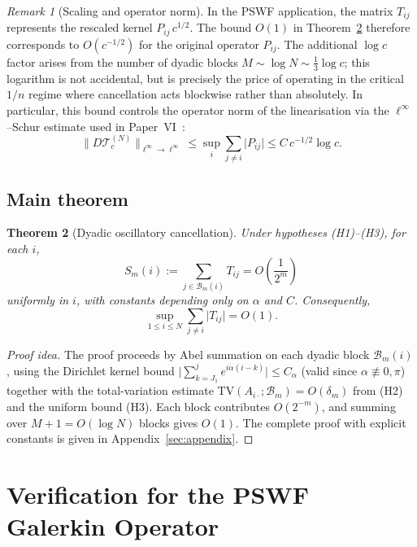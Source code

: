 \documentclass[12pt]{amsart}
\newtheorem{theorem}{Theorem}[section]
\theoremstyle{definition}
\theoremstyle{remark}
\newtheorem{remark}[theorem]{Remark}
\newcommand{\norm}[1]{\lVert#1\rVert}
\newcommand{\abs}[1]{\lvert#1\rvert}
\newcommand{\Bm}{\mathcal{B}_m}
\begin{document}
\begin{remark}[Scaling and operator norm]
\label{rem:scaling}
In the PSWF application, the matrix $T_{ij}$ represents the
rescaled kernel $P_{ij}\,c^{1/2}$.
The bound $O(1)$ in Theorem~\ref{thm:dyadic_cancellation}
therefore corresponds to $O(c^{-1/2})$ for the original
operator $P_{ij}$.
The additional $\log c$ factor arises from the number of
dyadic blocks $M \sim \log N \sim \tfrac{1}{3}\log c$;
this logarithm is not accidental, but is precisely the
price of operating in the critical $1/n$ regime where
cancellation acts blockwise rather than absolutely.
In particular, this bound controls the operator norm of the
linearisation via the $\ell^\infty$--Schur estimate used
in Paper~VI~\cite{paperVI}:
\[
  \norm{D\mathcal{T}_c^{(N)}}_{\ell^\infty\to\ell^\infty}
  \leq
  \sup_i \sum_{j\neq i} \abs{P_{ij}}
  \leq C\,c^{-1/2}\log c.
\]
\end{remark}

\subsection{Main theorem}

\begin{theorem}[Dyadic oscillatory cancellation]
\label{thm:dyadic_cancellation}
Under hypotheses \textup{(H1)--(H3)}, for each $i$,
\[
  S_m(i):=\sum_{j\in\Bm(i)} T_{ij}
  = O\!\left(\frac{1}{2^m}\right)
\]
uniformly in $i$, with constants depending only on $\alpha$
and $C$.
Consequently,
\[
  \sup_{1\leq i\leq N}\sum_{j\neq i}\abs{T_{ij}} = O(1).
\]
\end{theorem}

\begin{proof}[Proof idea]
The proof proceeds by Abel summation on each dyadic block
$\Bm(i)$, using the Dirichlet kernel bound
$\abs{\sum_{k=J_1}^j e^{i\alpha(i-k)}} \leq C_\alpha$
(valid since $\alpha\not\equiv 0,\pi$)
together with the total-variation estimate
$\mathrm{TV}(A_{i\cdot};\Bm) = O(\delta_m)$
from (H2) and the uniform bound (H3).
Each block contributes $O(2^{-m})$, and
summing over $M+1 = O(\log N)$ blocks gives $O(1)$.
The complete proof with explicit constants is given
in Appendix~\ref{sec:appendix}.
\end{proof}

\section{Verification for the PSWF Galerkin Operator}
\label{sec:PSWF}
\end{document}
